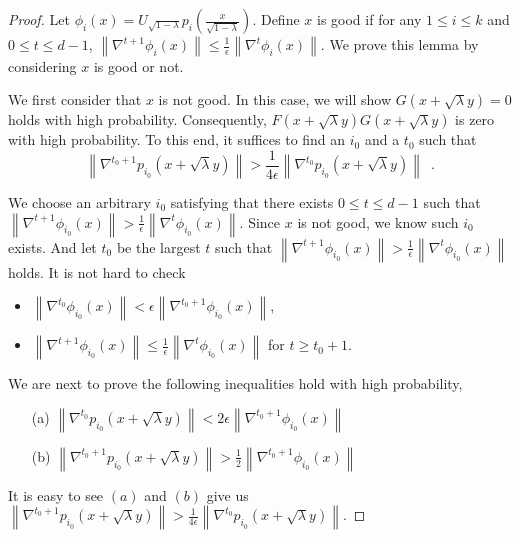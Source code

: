 \documentclass[12pt]{article}
\newcommand{\grad}[2]{\nabla^{#1}{#2}}
\newcommand{\br}[1]{\left(#1\right)} \newcommand{\Br}[1]{\left[#1\right]} \newcommand{\st}[1]{\left\{#1\right\}} \newcommand{\tr}[1]{\mathrm{Tr}\!\Br{#1}} \newcommand{\abs}[1]{\left|#1 \right|} \newcommand{\norm}[1]{\left\lVert #1 \right\rVert} \newcommand{\agl}[2]{\theta^{\br{#1}}_{#2}} \newcommand{\aglp}[2]{{\theta'}^{\br{#1}}_{#2}} \newcommand{\lint}[1]{\left\lfloor#1\right\rfloor} \newcommand{\poly}[1]{\mathrm{poly}\!\br{#1}} \newcommand{\negl}[1]{\mathrm{negl}\!\br{#1}} \newcommand{\de}[1]{\mathrm{d}#1} \newcommand{\val}[1]{\mathrm{val}\!\br{#1}} \newcommand{\vall}[1]{\mathrm{val}\br{#1}} \newcommand{\nd}[1]{\mathcal{N}\!\br{#1}} \newcommand{\ketbratwo}[2]{\ket{#1} \hspace{-0.4em}\bra{#2}} \newcommand{\ketbra}[1]{\ketbratwo{#1}{#1}} \newcommand{\id}{\ensuremath{\mathds{1}}} \newcommand{\ogroup}[1]{\mathrm{O}\!\br{#1}} \newcommand{\ugroup}[1]{\mathrm{U}\!\br{#1}} \newcommand{\td}{\mathrm{TD}} \newcommand{\tv}[1]{\norm{#1}_{\mathrm{TV}}} \newcommand {\defeq} {\ensuremath{ \stackrel{\mathrm{def}}{=} }} \newcommand{\vdim}{\ensuremath{N}} \newcommand{\dimin}{\ensuremath{n}} \newcommand{\dimout}{\ensuremath{m}} \newcommand{\ncopy}{\ell} \newcommand{\hspacein}{\H_\mathrm{in}} \newcommand{\hspaceout}{\H_\mathrm{out}} \newcommand{\Sin}{\S(\hspacein)} \newcommand{\Sout}{\S(\hspaceout)} \newcommand{\haar}{\ensuremath{\mu}} \newcommand{\tensorhaar}{\ensuremath{\eta}} \newcommand{\tensorsrss}{\ensuremath{\nu}} \newcommand{\qadvice}{\ensuremath{\rho}} \newcommand{\tp}{\otimes} \newcommand{\wone}[2]{W_1\!\br{#1,#2}}
\begin{document}
\begin{proof}
	Let $\phi_i(x) = U_{\sqrt{1-\lambda}} p_i\!\br{\frac{x}{\sqrt{1-\lambda}}}$.
	Define $x$ is good if for any $1\leq i\leq k$ and $0\leq t\leq d-1$, $ \norm{\grad{t+1}{\phi_i(x)}} \leq \frac{1}{\epsilon}\norm{\grad{t}{\phi_i(x)}} $.
	We prove this lemma by considering $x$ is good or not.
	
	We first consider that $x$ is not good. 
	In this case, we will show $G(x+\sqrt{\lambda}y) = 0$ holds
	with high probability.
	Consequently, $F(x+\sqrt{\lambda}y)G(x+\sqrt{\lambda}y)$ is zero with high probability.
	To this end, it suffices to find an $i_0$ and a $t_0$ such that
	\[
	\norm{ \grad{t_0+1}{p_{i_0}(x+\sqrt{\lambda}y)}}> \frac{1}{4\epsilon} \norm{ \grad{t_0}{p_{i_0}(x+\sqrt{\lambda}y)}} \enspace .
	\]
	
	We choose an arbitrary $i_0$ satisfying that there exists $0\leq t\leq d-1$ such that $ \norm{\grad{t+1}{\phi_{i_0}(x)}} > \frac{1}{\epsilon}\norm{\grad{t}{\phi_{i_0}(x)}} $.
	Since $x$ is not good, we know such $i_0$ exists. 
	And let $t_0$ be the largest $t$ such that $ \norm{\grad{t+1}{\phi_{i_0}(x)}} > \frac{1}{\epsilon}\norm{\grad{t}{\phi_{i_0}(x)}} $ holds. It is not hard to check
	\begin{itemize}
		\item $ \norm{\grad{t_0}{\phi_{i_0}(x)}} < {\epsilon}\norm{\grad{t_0+1}{\phi_{i_0}(x)}} $,
		\item $ \norm{\grad{t+1}{\phi_{i_0}(x)}} \leq \frac{1}{\epsilon}\norm{\grad{t}{\phi_{i_0}(x)}} $ for $t\geq t_0+1$.
	\end{itemize}
	We are next to prove the following inequalities hold with high probability,
	\begin{itemize}
		\item[(a)] $
	\norm{ \grad{t_0}{p_{i_0}(x+\sqrt{\lambda}y)}} < 2\epsilon\norm{ \grad{t_0+1}{\phi_{i_0}(x)}}$
		\item[(b)] $
	\norm{ \grad{t_0+1}{p_{i_0}(x+\sqrt{\lambda}y)}}> \frac{1}{2}\norm{ \grad{t_0+1}{\phi_{i_0}(x)}}$
	\end{itemize}
	It is easy to see $(a)$ and $(b)$ give us $\norm{ \grad{t_0+1}{p_{i_0}(x+\sqrt{\lambda}y)}}> \frac{1}{4\epsilon} \norm{ \grad{t_0}{p_{i_0}(x+\sqrt{\lambda}y)}}$.
	\vspace{-1em}

\end{proof}
\end{document}
